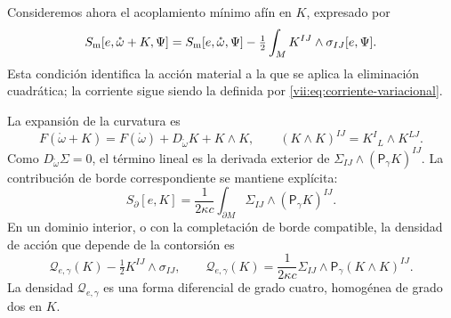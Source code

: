 Consideremos ahora el acoplamiento mínimo afín en \(K\), expresado por
\begin{equation}
 S_{\rm m}[e,\mathring\omega+K,\Psi]
 =S_{\rm m}[e,\mathring\omega,\Psi]
   -\tfrac12\int_M K^{IJ}\wedge\sigma_{IJ}[e,\Psi].
 \label{vii:eq:materia-afin-contorsion}
\end{equation}
Esta condición identifica la acción material a la que se aplica la
eliminación cuadrática; la corriente sigue siendo la definida por
\eqref{vii:eq:corriente-variacional}.

La expansión de la curvatura es
\begin{equation}
 F(\mathring\omega+K)
 =F(\mathring\omega)+D_{\mathring\omega}K+K\wedge K,
 \qquad (K\wedge K)^{IJ}=K^I{}_{L}\wedge K^{LJ}.
 \label{vii:eq:curvatura-contorsion}
\end{equation}
Como \(D_{\mathring\omega}\Sigma=0\), el término lineal es la
derivada exterior de \(\Sigma_{IJ}\wedge(\mathsf P_\gamma K)^{IJ}\).
La contribución de borde correspondiente se mantiene explícita:
\begin{equation}
 S_\partial[e,K]=\frac1{2\kappa c}
     \int_{\partial M}\Sigma_{IJ}\wedge(\mathsf P_\gamma K)^{IJ}.
 \label{vii:eq:borde-contorsion}
\end{equation}
En un dominio interior, o con la completación de borde compatible,
la densidad de acción que depende de la contorsión es
\begin{equation}
 \mathcal Q_{e,\gamma}(K)-\tfrac12K^{IJ}\wedge\sigma_{IJ},
 \qquad
 \mathcal Q_{e,\gamma}(K)
  =\frac1{2\kappa c}\Sigma_{IJ}\wedge
                         \mathsf P_\gamma(K\wedge K)^{IJ}.
 \label{vii:eq:forma-cuadratica-contorsion}
\end{equation}
La densidad \(\mathcal Q_{e,\gamma}\) es una forma diferencial de
grado cuatro, homogénea de grado dos en \(K\).

